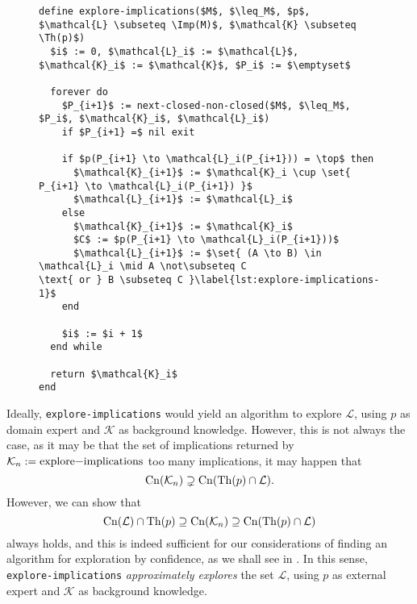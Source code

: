 \begin{figure}[tp]
  \centering
  \begin{Algorithm}
    \label{alg:explore-implications}
    \hspace*{0cm}
\begin{lstlisting}
define explore-implications($M$, $\leq_M$, $p$, $\mathcal{L} \subseteq \Imp(M)$, $\mathcal{K} \subseteq \Th(p)$)
  $i$ := 0, $\mathcal{L}_i$ := $\mathcal{L}$, $\mathcal{K}_i$ := $\mathcal{K}$, $P_i$ := $\emptyset$

  forever do
    $P_{i+1}$ := next-closed-non-closed($M$, $\leq_M$, $P_i$, $\mathcal{K}_i$, $\mathcal{L}_i$)
    if $P_{i+1} =$ nil exit

    if $p(P_{i+1} \to \mathcal{L}_i(P_{i+1})) = \top$ then
      $\mathcal{K}_{i+1}$ := $\mathcal{K}_i \cup \set{ P_{i+1} \to \mathcal{L}_i(P_{i+1}) }$
      $\mathcal{L}_{i+1}$ := $\mathcal{L}_i$
    else
      $\mathcal{K}_{i+1}$ := $\mathcal{K}_i$
      $C$ := $p(P_{i+1} \to \mathcal{L}_i(P_{i+1}))$
      $\mathcal{L}_{i+1}$ := $\set{ (A \to B) \in \mathcal{L}_i \mid A \not\subseteq C
\text{ or } B \subseteq C }\label{lst:explore-implications-1}$
    end

    $i$ := $i + 1$
  end while

  return $\mathcal{K}_i$  
end
\end{lstlisting}
  \end{Algorithm}
\end{figure}

Ideally, \lstinline{explore-implications} would yield an algorithm to explore
$\mathcal{L}$, using $p$ as domain expert and $\mathcal{K}$ as background knowledge.
However, this is not always the case, as it may be that the set of implications returned
by $\mathcal{K}_{n} := \text{\lstinline{explore-implications}}$ too many implications, \ie
it may happen that
\begin{equation*}
  \operatorname{Cn}(\mathcal{K}_{n}) \supsetneq \operatorname{Cn}(\operatorname{Th}(p) \cap \mathcal{L}).
\end{equation*}
However, we can show that
\begin{equation}
  \label{eq:61}
  \operatorname{Cn}(\mathcal{L}) \cap \operatorname{Th}(p) \supseteq \operatorname{Cn}(\mathcal{K}_{n}) \supseteq \operatorname{Cn}(\operatorname{Th}(p) \cap \mathcal{L})
\end{equation}
always holds, and this is indeed sufficient for our considerations of finding an algorithm
for exploration by confidence, as we shall see in .  In this
sense, \lstinline{explore-implications} \emph{approximately explores} the set
$\mathcal{L}$, using $p$ as external expert and $\mathcal{K}$ as background knowledge.

